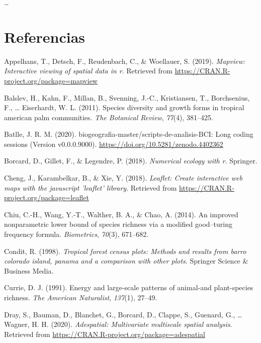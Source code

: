 \documentclass[11pt,]{article}
\begin{document}
\ldots

\section*{Referencias}\label{referencias}

\hypertarget{refs}{}
\hypertarget{ref-MapView}{}
Appelhans, T., Detsch, F., Reudenbach, C., \& Woellauer, S. (2019).
\emph{Mapview: Interactive viewing of spatial data in r}. Retrieved from
\url{https://CRAN.R-project.org/package=mapview}

\hypertarget{ref-balslev2011species}{}
Balslev, H., Kahn, F., Millan, B., Svenning, J.-C., Kristiansen, T.,
Borchsenius, F., \ldots{} Eiserhardt, W. L. (2011). Species diversity
and growth forms in tropical american palm communities. \emph{The
Botanical Review}, \emph{77}(4), 381--425.

\hypertarget{ref-jose_ramon_martinez_batlle_2020_4402362}{}
Batlle, J. R. M. (2020). biogeografia-master/scripts-de-analisis-BCI:
Long coding sessions (Version v0.0.0.9000).
\url{https://doi.org/10.5281/zenodo.4402362}

\hypertarget{ref-borcard2018numerical}{}
Borcard, D., Gillet, F., \& Legendre, P. (2018). \emph{Numerical ecology
with r}. Springer.

\hypertarget{ref-Leaflet}{}
Cheng, J., Karambelkar, B., \& Xie, Y. (2018). \emph{Leaflet: Create
interactive web maps with the javascript 'leaflet' library}. Retrieved
from \url{https://CRAN.R-project.org/package=leaflet}

\hypertarget{ref-chiu2014improved}{}
Chiu, C.-H., Wang, Y.-T., Walther, B. A., \& Chao, A. (2014). An
improved nonparametric lower bound of species richness via a modified
good--turing frequency formula. \emph{Biometrics}, \emph{70}(3),
671--682.

\hypertarget{ref-condit1998tropical}{}
Condit, R. (1998). \emph{Tropical forest census plots: Methods and
results from barro colorado island, panama and a comparison with other
plots}. Springer Science \& Business Media.

\hypertarget{ref-currie1991energy}{}
Currie, D. J. (1991). Energy and large-scale patterns of animal-and
plant-species richness. \emph{The American Naturalist}, \emph{137}(1),
27--49.

\hypertarget{ref-adespatial}{}
Dray, S., Bauman, D., Blanchet, G., Borcard, D., Clappe, S., Guenard,
G., \ldots{} Wagner, H. H. (2020). \emph{Adespatial: Multivariate
multiscale spatial analysis}. Retrieved from
\url{https://CRAN.R-project.org/package=adespatial}
\end{document}
